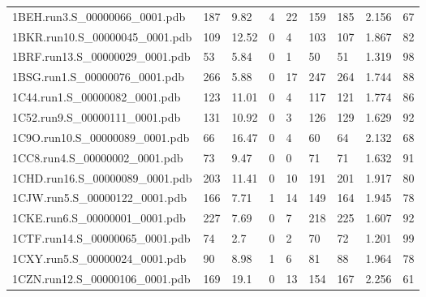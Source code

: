 \documentclass{bioinfo}
\begin{document}
\begin{table*}[!t]
{\begin{tabular}{lllllllll}
    1BEH.run3.S\_00000066\_0001.pdb & 187      & 9.82       & 4           & 22          & 159         & 185     & 2.156           & 67           \\
    1BKR.run10.S\_00000045\_0001.pdb & 109      & 12.52      & 0           & 4           & 103         & 107     & 1.867           & 82           \\
    1BRF.run13.S\_00000029\_0001.pdb & 53       & 5.84       & 0           & 1           & 50          & 51      & 1.319           & 98           \\
    1BSG.run1.S\_00000076\_0001.pdb & 266      & 5.88       & 0           & 17          & 247         & 264     & 1.744           & 88           \\
    1C44.run1.S\_00000082\_0001.pdb & 123      & 11.01      & 0           & 4           & 117         & 121     & 1.774           & 86           \\
    1C52.run9.S\_00000111\_0001.pdb & 131      & 10.92      & 0           & 3           & 126         & 129     & 1.629           & 92           \\
    1C9O.run10.S\_00000089\_0001.pdb & 66       & 16.47      & 0           & 4           & 60          & 64      & 2.132           & 68           \\
    1CC8.run4.S\_00000002\_0001.pdb & 73       & 9.47       & 0           & 0           & 71          & 71      & 1.632           & 91           \\
    1CHD.run16.S\_00000089\_0001.pdb & 203      & 11.41      & 0           & 10          & 191         & 201     & 1.917           & 80           \\
    1CJW.run5.S\_00000122\_0001.pdb & 166      & 7.71       & 1           & 14          & 149         & 164     & 1.945           & 78           \\
    1CKE.run6.S\_00000001\_0001.pdb & 227      & 7.69       & 0           & 7           & 218         & 225     & 1.607           & 92           \\
    1CTF.run14.S\_00000065\_0001.pdb & 74       & 2.7        & 0           & 2           & 70          & 72      & 1.201           & 99           \\
    1CXY.run5.S\_00000024\_0001.pdb & 90       & 8.98       & 1           & 6           & 81          & 88      & 1.964           & 78           \\
    1CZN.run12.S\_00000106\_0001.pdb & 169      & 19.1       & 0           & 13          & 154         & 167     & 2.256           & 61           \\

\end{tabular}}
\end{table*}
\end{document}
